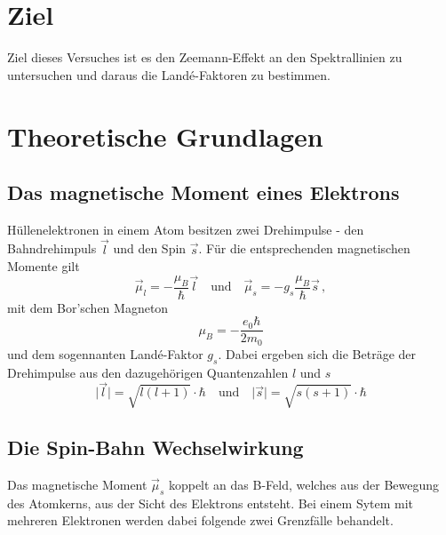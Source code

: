    \section{Ziel}
        Ziel dieses Versuches ist es den Zeemann-Effekt an den Spektrallinien zu untersuchen und
        daraus die Landé-Faktoren zu bestimmen.
    \section{Theoretische Grundlagen}
        \subsection{Das magnetische Moment eines Elektrons}
            Hüllenelektronen in einem Atom besitzen zwei Drehimpulse - den Bahndrehimpuls $\vec{l}$ und den Spin $\vec{s}$.
            Für die entsprechenden magnetischen Momente gilt
            \begin{equation}
                \vec{\mu}_l = -\frac{\mu_B}{\hbar}\vec{l} \quad\text{und}\quad \vec{\mu}_s = -g_s\frac{\mu_B}{\hbar}\vec{s} \, ,
            \end{equation}
            mit dem Bor'schen Magneton
            \begin{equation}
                \mu_B=-\frac{e_0\hbar}{2m_0}
            \end{equation}
            und dem sogennanten Landé-Faktor $g_s$.
            Dabei ergeben sich die Beträge der Drehimpulse aus den dazugehörigen Quantenzahlen $l$ und $s$
            \begin{equation}
                \vert\vec{l}\vert=\sqrt{l(l+1)}\cdot\hbar \quad\text{und}\quad \vert\vec{s}\vert=\sqrt{s(s+1)}\cdot\hbar
            \end{equation}
        \subsection{Die Spin-Bahn Wechselwirkung}
            Das magnetische Moment $\vec{\mu}_s$ koppelt an das B-Feld, welches aus der Bewegung des Atomkerns,
            aus der Sicht des Elektrons entsteht.
            Bei einem Sytem mit mehreren Elektronen werden dabei folgende zwei Grenzfälle behandelt.
